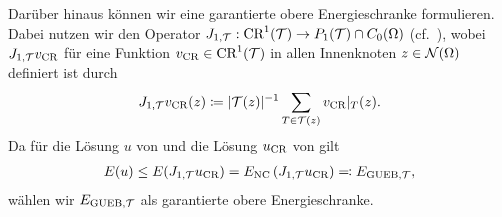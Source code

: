 Darüber hinaus können wir eine garantierte obere Energieschranke formulieren.
Dabei nutzen wir den Operator $J_{1,\mathcal{T}}:\textup{CR}^1(\mathcal{T})\to P_1(\mathcal{T})\cap
C_0(\Omega)$ (cf.\ \cite[Section 4]{CH18}), wobei $J_{1, \mathcal{T}}v_\textup{CR}$ für eine
Funktion $v_\textup{CR}\in\textup{CR}^1(\mathcal{T})$ in allen Innenknoten $z\in\mathcal{N}(\Omega)$
definiert ist durch
\begin{align}
  \label{eq:enrichmentOperator}
  J_{1,  \mathcal{T}}v_\textup{CR}(z)\coloneqq |\mathcal{T}(z)|^{-1}\sum_{T\in\mathcal{T}(z)}v_\textup{CR}|_T(z).
\end{align}
Da für die Lösung $u$ von  und die Lösung
$u_\textup{CR}$ von  gilt 
\begin{align}
  \label{eq:gueb}
  E(u)\leq E(J_{1, \mathcal{T}}u_\textup{CR})=E_\textup{NC}\left(J_{1, \mathcal{T}}u_\textup{CR}\right)
  \eqqcolon E_{\textup{GUEB}, \mathcal{T}},
\end{align}
wählen wir $E_{\textup{GUEB}, \mathcal{T}}$ als garantierte obere Energieschranke.
